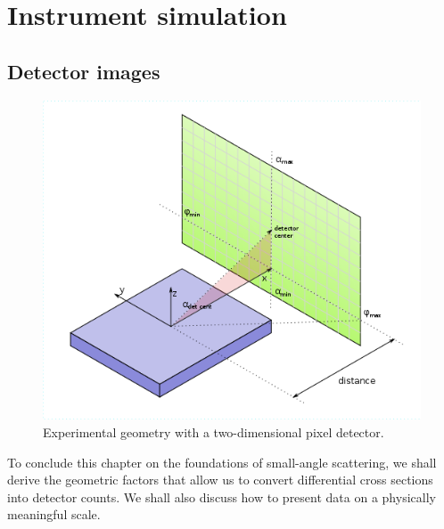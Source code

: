 
\chapter{Instrument simulation}  \label{SInstr}

\section{Detector images}\label{SdetImg}

\def\tc{\text{c}}

\begin{figure}[t]
\begin{center}
\includegraphics[width=.5\textwidth]{fig/drawing/experimental_geometry.png}
\end{center}
\caption{Experimental geometry with a two-dimensional pixel detector.}
\label{FexpGeom}
\end{figure}

To conclude this chapter on the foundations of small-angle scattering,
we shall derive the geometric factors
that allow us to convert differential cross sections into detector counts.
We shall also discuss how to present data on a physically meaningful scale.

